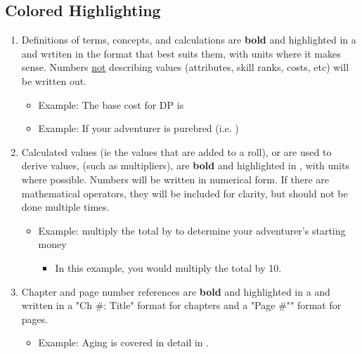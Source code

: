 \subsection{Colored Highlighting}
\begin{enumerate}[leftmargin=12pt]
\item Definitions of terms, concepts, and calculations are \textbf{bold} and highlighted in a   and wrtiten in the format that best suits them, with units where it makes sense. Numbers \uline{not} describing values (attributes, skill ranks, costs, etc) will be written out.
	\begin{itemize}\item Example: The base cost for DP is \end{itemize}
	\begin{itemize}\item Example: If your adventurer is purebred (i.e. )\end{itemize}
\item Calculated values (ie the values that are added to a roll), or are used to derive values, (such as multipliers), are \textbf{bold} and highlighted in  , with units where possible. Numbers will be written in numerical form. If there are mathematical operators, they will be included for clarity, but should not be done multiple times.
	\begin{itemize}\item Example: multiply the total by  to determine your adventurer's starting money
		\begin{itemize}\item In this example, you would multiply the total by 10.\end{itemize}
	\end{itemize}
\item Chapter and page number references are \textbf{bold} and highlighted in a   and written in a "Ch \#: Title" format for chapters and a "Page \#"" format for pages.
	\begin{itemize}\item Example: Aging is covered in detail in .\end{itemize}

\end{enumerate}

